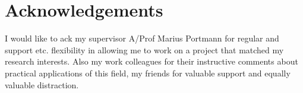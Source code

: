 \chapter{Acknowledgements}

I would like to ack my supervisor A/Prof Marius Portmann for regular and support etc. flexibility in allowing me to work on a project that matched my research interests. Also my work colleagues for their instructive comments about practical applications of this field, my friends for valuable support and equally valuable distraction.
